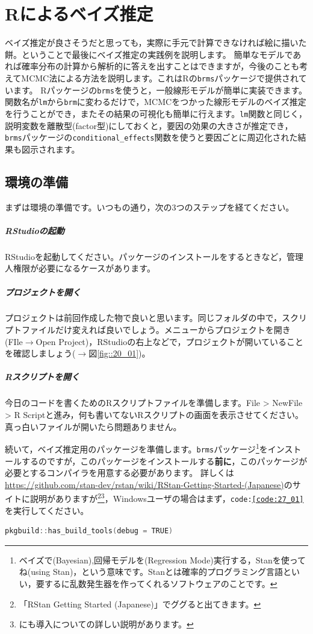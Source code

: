 \documentclass{ltjsarticle}
\begin{document}
\chapter{Rによるベイズ推定}
\label{chapter27}
ベイズ推定が良さそうだと思っても，実際に手元で計算できなければ絵に描いた餅。ということで最後にベイズ推定の実践例を説明します。
簡単なモデルであれば確率分布の計算から解析的に答えを出すことはできますが，今後のことも考えてMCMC法による方法を説明します。これはRの\texttt{brms}パッケージ\citep{brmsCite1,brmsCite2}で提供されています。
Rパッケージの\texttt{brms}を使うと，一般線形モデルが簡単に実装できます。関数名が\texttt{lm}から\texttt{brm}に変わるだけで，MCMCをつかった線形モデルのベイズ推定を行うことができ，またその結果の可視化も簡単に行えます。\texttt{lm}関数と同じく，説明変数を離散型(factor型)にしておくと，要因の効果の大きさが推定でき，\texttt{brms}パッケージの\verb|conditional_effects|関数を使うと要因ごとに周辺化された結果も図示されます。
\section{環境の準備}
まずは環境の準備です。いつもの通り，次の3つのステップを経てください。
\paragraph{RStudioの起動}RStudioを起動してください。パッケージのインストールをするときなど，管理人権限が必要になるケースがあります。
\paragraph{プロジェクトを開く}プロジェクトは前回作成した物で良いと思います。同じフォルダの中で，スクリプトファイルだけ変えれば良いでしょう。メニューからプロジェクトを開き(FIle$\to$Open Project)，RStudioの右上などで，プロジェクトが開いていることを確認しましょう($\to$図\ref{fig::20_01})。
\paragraph{Rスクリプトを開く}今日のコードを書くためのRスクリプトファイルを準備します。File > NewFile > R Scriptと進み，何も書いてないRスクリプトの画面を表示させてください。真っ白いファイルが開いたら問題ありません。

続いて，ベイズ推定用のパッケージを準備します。\texttt{brms}パッケージ\footnote{ベイズで(Bayesian),回帰モデルを(Regression Mode)実行する，Stanを使ってね(using Stan)，という意味です。Stanとは確率的プログラミング言語といい，要するに乱数発生器を作ってくれるソフトウェアのことです。}をインストールするのですが，このパッケージをインストールする\textbf{前に}，このパッケージが必要とするコンパイラを用意する必要があります。
詳しくは \url{https://github.com/stan-dev/rstan/wiki/RStan-Getting-Started-(Japanese)}のサイトに説明がありますが\footnote{「RStan Getting Started (Japanese)」でググると出てきます。}\footnote{\citet{Baba201907}にも導入についての詳しい説明があります。}，Windowsユーザの場合はまず，\texttt{code:\ref{code:27_01}}を実行してください。
\begin{lstlisting}[language=c++,label={code:27_01},caption={必要なツールをインストールする}]
pkgbuild::has_build_tools(debug = TRUE)
\end{lstlisting}
\end{document}
